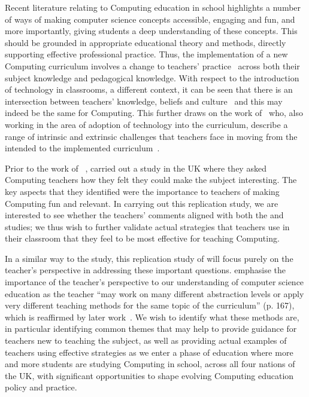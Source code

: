 \documentclass[]{interact}
\theoremstyle{plain}%
\theoremstyle{definition}
\theoremstyle{remark}
\begin{document}
{Recent literature relating to Computing education in school
highlights a number of ways of making computer science concepts
accessible, engaging and fun, and more importantly, giving students a
deep understanding of these concepts. This should be grounded in
appropriate educational theory and methods, directly supporting
effective professional practice. Thus, the implementation of a new
Computing curriculum involves a change to teachers’
practice~\citep{thompson+bell:2013,sentance+humphreys:2017,
moller+crick:jce2018} across both their subject knowledge and
pedagogical knowledge. With respect to the introduction of technology
in classrooms, a different context, it can be seen that there is an
intersection between teachers’ knowledge, beliefs and
culture~\citep{ertner+ottenbreit-leftwich:2010,voogt+mckenney:2017}
and this may indeed be the same for Computing. This further draws on
the work of~\citet{finger+houguet:2009} who, also working in the area
of adoption of technology into the curriculum, describe a range of
intrinsic and extrinsic challenges that teachers face in moving from
the intended to the implemented
curriculum~\citep{vandenakker:2004,vinnervik:2020}.

Prior to the work of ~\citet{sentance+csizmadia:2017},
\citet{black-et-al:2013} carried out a study in the UK where they
asked Computing teachers how they felt they could make the subject
interesting. The key aspects that they identified were the importance
to teachers of making Computing fun and relevant. In carrying out this
replication study, we are interested to see whether the teachers’
comments aligned with both the \citeauthor*{black-et-al:2013} and
\citeauthor*{sentance+csizmadia:2017} studies; we thus wish to
further validate actual strategies that teachers use in their
classroom that they feel to be most effective for teaching Computing.

In a similar way to the \citet{black-et-al:2013} study, this
replication study of \citet{sentance+csizmadia:2017} will focus purely
on the teacher’s perspective in addressing these important
questions. \citet{diethelm-et-al:2012} emphasise the importance of the
teacher’s perspective to our understanding of computer science
education as the teacher ``may work on many different abstraction
levels or apply very different teaching methods for the same topic of
the curriculum'' (p. 167), which is reaffirmed by later
work~\citep{bender-et-al:2015,hubbard:2018}. We wish to identify what
these methods are, in particular identifying common themes that may
help to provide guidance for teachers new to teaching the subject, as
well as providing actual examples of teachers using effective
strategies as we enter a phase of education where more and more
students are studying Computing in school, across all four nations of
the UK, with significant opportunities to shape evolving Computing
education policy and practice.

}
\end{document}
